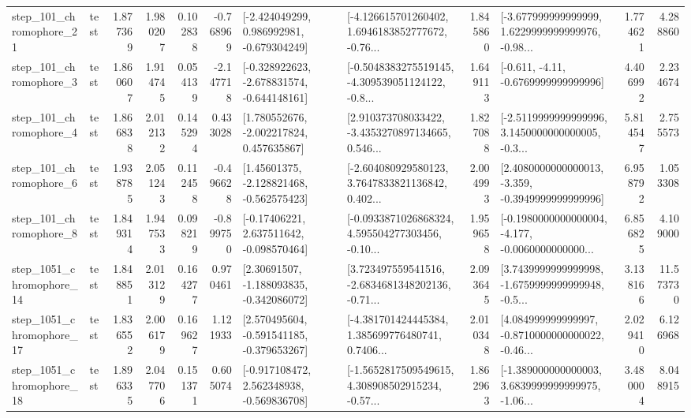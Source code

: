\begin{tabular}{llrrrrllrlrr}
  step\_101\_chromophore\_21 &      test &      1.877369 &    1.980207 &      0.102838 & -0.768969 &   [-2.424049299, 0.986992981, -0.679304249] &  [-4.126615701260402, 1.6946183852777672, -0.76... &       1.845860 &  [-3.677999999999999, 1.6229999999999976, -0.98... &            1.774621 &          4.288860 \\
   step\_101\_chromophore\_3 &      test &      1.860607 &    1.914745 &      0.054139 & -2.147718 &  [-0.328922623, -2.678831574, -0.644148161] &  [-0.5048383275519145, -4.309539051124122, -0.8... &       1.649113 &               [-0.611, -4.11, -0.6769999999999996] &            4.406992 &          2.234674 \\
   step\_101\_chromophore\_4 &      test &      1.866838 &    2.012132 &      0.145294 &  0.433028 &    [1.780552676, -2.002217824, 0.457635867] &  [2.910373708033422, -3.4353270897134665, 0.546... &       1.827088 &  [-2.5119999999999996, 3.1450000000000005, -0.3... &            5.814547 &          2.755573 \\
   step\_101\_chromophore\_6 &      test &      1.938785 &    2.051243 &      0.112458 & -0.496628 &    [1.45601375, -2.128821468, -0.562575423] &  [-2.604080929580123, 3.7647833821136842, 0.402... &       2.004993 &  [2.4080000000000013, -3.359, -0.3949999999999996] &            6.958792 &          1.053308 \\
   step\_101\_chromophore\_8 &      test &      1.849314 &    1.947533 &      0.098219 & -0.899750 &    [-0.17406221, 2.637511642, -0.098570464] &  [-0.0933871026868324, 4.595504277303456, -0.10... &       1.959658 &  [-0.1980000000000004, -4.177, -0.0060000000000... &            6.856825 &          4.109000 \\
 step\_1051\_chromophore\_14 &      test &      1.848851 &    2.013129 &      0.164277 &  0.970461 &    [2.30691507, -1.188093835, -0.342086072] &  [3.723497559541516, -2.6834681348202136, -0.71... &       2.093645 &  [3.7439999999999998, -1.6759999999999948, -0.5... &            3.138166 &         11.573730 \\
 step\_1051\_chromophore\_17 &      test &      1.836552 &    2.006179 &      0.169627 &  1.121933 &   [2.570495604, -0.591541185, -0.379653267] &  [-4.381701424445384, 1.385699776480741, 0.7406... &       2.010348 &  [4.084999999999997, -0.8710000000000022, -0.46... &            2.029410 &          6.126968 \\
 step\_1051\_chromophore\_18 &      test &      1.896335 &    2.047706 &      0.151371 &  0.605074 &   [-0.917108472, 2.562348938, -0.569836708] &  [-1.5652817509549615, 4.308908502915234, -0.57... &       1.862963 &  [-1.389000000000003, 3.6839999999999975, -1.06... &            3.480004 &          8.048915 \\

\end{tabular}
